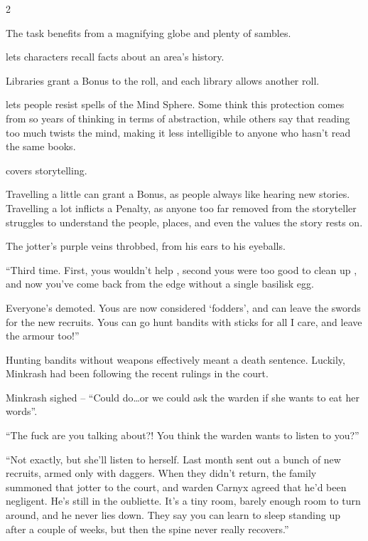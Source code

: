 \begin{multicols}{2}
\begin{description}
    The task benefits from a magnifying globe and plenty of sambles.
  \item[\roll{Intelligence}{Academics}]
    lets characters recall facts about an area's history.

    Libraries grant a Bonus to the roll, and each library allows another roll.
  \item[\roll{Wits}{Academics}]
    lets people resist spells of the Mind Sphere.
    Some think this protection comes from so years of thinking in terms of abstraction, while others say that reading too much twists the mind, making it less intelligible to anyone who hasn't read the same books.
  \item[\roll{Charisma}{Academics}]
    covers storytelling.

    Travelling a little can grant a Bonus, as people always like hearing new stories.
    Travelling a lot inflicts a Penalty, as anyone too far removed from the storyteller struggles to understand the people, places, and even the values the story rests on.
\end{description}

\begin{exampletext}
  The \gls{jotter}'s purple veins throbbed, from his ears to his eyeballs.

  ``Third time.
  First, yous wouldn't help , second yous were too good to clean up , and now you've come back from the \gls{edge} without a single \gls{basilisk} egg.

  Everyone's demoted.
  Yous are now considered `\glspl{fodder}', and can leave the swords for the new recruits.
  Yous can go hunt bandits with sticks for all I care, and leave the armour too!''

  Hunting bandits without weapons effectively meant a death sentence.
  Luckily, Minkrash had been following the recent rulings in the \gls{court}.

  Minkrash sighed -- ``Could do\ldots or we could ask the \gls{warden} if she wants to eat her words''.

  ``The fuck are you talking about?!
  You think the \gls{warden} wants to listen to you?''

  ``Not exactly, but she'll listen to herself.
  Last month  sent out a bunch of new recruits, armed only with daggers.
  When they didn't return, the family summoned that \gls{jotter} to the \gls{court}, and \Gls{warden} Carnyx agreed that he'd been negligent.
  He's still in the oubliette.
  It's a tiny room, barely enough room to turn around, and he never lies down.
  They say you can learn to sleep standing up after a couple of weeks, but then the spine never really recovers.''


\end{exampletext}
\end{multicols}
